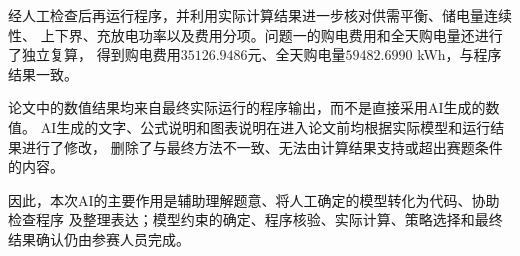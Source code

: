 \documentclass[withoutpreface,bwprint]{cumcmthesis}
\begin{document}
经人工检查后再运行程序，并利用实际计算结果进一步核对供需平衡、储电量连续性、
上下界、充放电功率以及费用分项。问题一的购电费用和全天购电量还进行了独立复算，
得到购电费用$35126.9486$元、全天购电量$59482.6990$ kWh，与程序结果一致。

论文中的数值结果均来自最终实际运行的程序输出，而不是直接采用AI生成的数值。
AI生成的文字、公式说明和图表说明在进入论文前均根据实际模型和运行结果进行了修改，
删除了与最终方法不一致、无法由计算结果支持或超出赛题条件的内容。

因此，本次AI的主要作用是辅助理解题意、将人工确定的模型转化为代码、协助检查程序
及整理表达；模型约束的确定、程序核验、实际计算、策略选择和最终结果确认仍由参赛人员完成。
\end{document}
